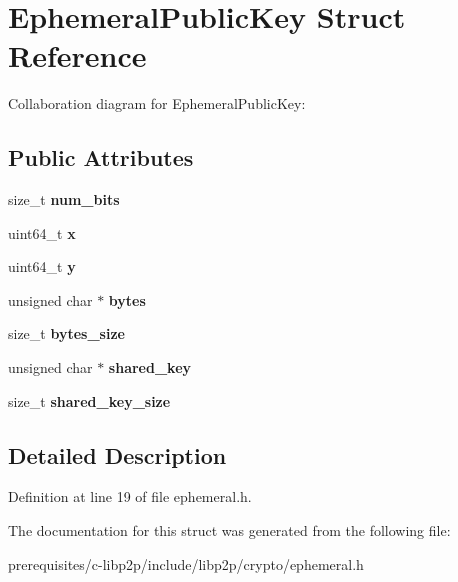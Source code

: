 \hypertarget{struct_ephemeral_public_key}{}\section{Ephemeral\+Public\+Key Struct Reference}
\label{struct_ephemeral_public_key}


Collaboration diagram for Ephemeral\+Public\+Key\+:
\subsection*{Public Attributes}
\begin{DoxyCompactItemize}
\item 
\mbox{\label{struct_ephemeral_public_key_afbe726004591b93c9074efc7e8e950c9}} 
size\+\_\+t {\bfseries num\+\_\+bits}
\item 
\mbox{\label{struct_ephemeral_public_key_afc1242c216d3d3b00ae3a430856d6235}} 
uint64\+\_\+t {\bfseries x}
\item 
\mbox{\label{struct_ephemeral_public_key_a37e939c39d7a4ed7ca18a74de741bad1}} 
uint64\+\_\+t {\bfseries y}
\item 
\mbox{\label{struct_ephemeral_public_key_a71b50fc1986865e2102dc9ebdb8a069b}} 
unsigned char $\ast$ {\bfseries bytes}
\item 
\mbox{\label{struct_ephemeral_public_key_aa871abd35b34e2f753d1455990f8d5e5}} 
size\+\_\+t {\bfseries bytes\+\_\+size}
\item 
\mbox{\label{struct_ephemeral_public_key_a42788c9b35b422c0c241c09577f3a33b}} 
unsigned char $\ast$ {\bfseries shared\+\_\+key}
\item 
\mbox{\label{struct_ephemeral_public_key_ad122a5d09416bbb78dc099860328249e}} 
size\+\_\+t {\bfseries shared\+\_\+key\+\_\+size}
\end{DoxyCompactItemize}


\subsection{Detailed Description}


Definition at line 19 of file ephemeral.\+h.



The documentation for this struct was generated from the following file\+:\begin{DoxyCompactItemize}
\item 
prerequisites/c-\/libp2p/include/libp2p/crypto/ephemeral.\+h\end{DoxyCompactItemize}
